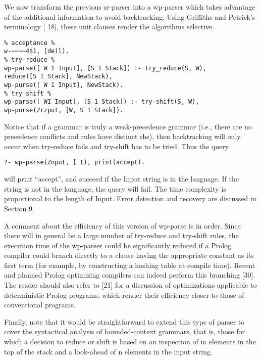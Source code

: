 We now transform the previous sr-parser into a wp-parser which takes
advantage of the additional information to avoid backtracking. Using 
Griffiths and Petrick’s terminology [ 18], these unit clauses render the
algorithms selective. 
\begin{verbatim}
% acceptance %
w-~~~~4$1, [de)l).
% try-reduce %
wp-parse([ W 1 Input], [S 1 Stack]) :- try_reduce(S, W),
reduce([S 1 Stack], NewStack),
wp-purse([ W 1 Input], NewStack).
% try shift %
wp-parse([ WI Input], [S 1 Stack]) :- try-shift(S, W),
wp-purse(Zrzput, [W, S 1 Stack]). 
\end{verbatim}
Notice that if a grammar is truly a weak-precedence grammar (i.e., there are no
precedence conflicts and rules have distinct rhs), then backtracking will only
occur when try-reduce fails and try-shift has to be tried. Thus the query
\begin{verbatim}
?- wp-parse(Znput, [ I), print(accept).
\end{verbatim}
will print “accept”, and succeed if the Input string is in the language. If the string
is not in the language, the query will fail. The time complexity is proportional to
the length of Input. Error detection and recovery are discussed in Section 9.

A comment about the efficiency of this version of wp-parse is in order. Since
there will in general be a large number of try-reduce and try-shift rules, the
execution time of the wp-parser could be significantly reduced if a Prolog compiler
could branch directly to a clause having the appropriate constant as its first term
(for example, by constructing a hashing table at compile time). Recent and
planned Prolog optimizing compilers can indeed perform this branching [30].
The reader should also refer to [21] for a discussion of optimizations applicable
to deterministic Prolog programs, which render their efficiency closer to those of
conventional programs. 

Finally, note that it would be straightforward to extend this type of parser to
cover the syntactical analysis of bounded-context grammars, that is, those for
which a decision to reduce or shift is based on an inspection of m elements in
the top of the stack and a look-ahead of n elements in the input string.  

\secup

\secup